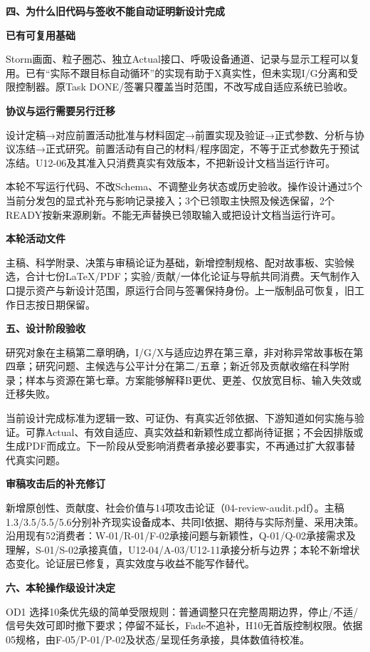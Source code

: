 \documentclass[11pt,a4paper]{article}
\newcommand{\reviewsection}[1]{\par\Needspace{9\baselineskip}\vspace{10pt}\begin{center}{\titlelatin\titlecjk\bfseries\fontsize{14}{20}\selectfont #1}\end{center}}
\newcommand{\reviewsubsection}[1]{\par\Needspace{4\baselineskip}\vspace{4pt}\begin{center}{\titlelatin\titlecjk\bfseries\fontsize{12}{18}\selectfont #1}\end{center}}
\begin{document}
\reviewsection{四、为什么旧代码与签收不能自动证明新设计完成}
\reviewsubsection{4.1 已有可复用基础}
Storm画面、粒子圈芯、独立Actual接口、呼吸设备通道、记录与显示工程可以复用。已有“实际不跟目标自动循环”的实现有助于X真实性，但未实现I/\allowbreak{}G分离和受限控制器。原Task DONE/\allowbreak{}签署只覆盖当时范围，不改写成自适应系统已验收。


\reviewsubsection{4.2 协议与运行需要另行迁移}
设计定稿→对应前置活动批准与材料固定→前置实现及验证→正式参数、分析与协议冻结→正式研究。前置活动有自己的材料/\allowbreak{}程序固定，不等于正式参数先于预试冻结。U12-\allowbreak{}06及其准入只消费真实有效版本，不把新设计文档当运行许可。


本轮不写运行代码、不改Schema、不调整业务状态或历史验收。操作设计通过5个当前分发包的显式补充与影响记录接入；3个已领取主快照及候选保留，2个READY按新来源刷新。不能无声替换已领取输入或把设计文档当运行许可。


\reviewsubsection{4.3 本轮活动文件}
主稿、科学附录、决策与审稿论证为基础，新增控制规格、配对故事板、实验候选，合计七份LaTeX/\allowbreak{}PDF；实验/贡献/一体化论证与导航共同消费。天气制作入口提示资产与新设计范围，原运行合同与签署保持身份。上一版制品可恢复，旧工作日志按日期保留。


\reviewsection{五、设计阶段验收}
研究对象在主稿第二章明确，I/\allowbreak{}G/\allowbreak{}X与适应边界在第三章，非对称异常故事板在第四章；研究问题、主候选与公平计分在第二/\allowbreak{}五章；新近邻及贡献收缩在科学附录；样本与资源在第七章。方案能够解释B更优、更差、仅放宽目标、输入失效或迁移失败。


当前设计完成标准为逻辑一致、可证伪、有真实近邻依据、下游知道如何实施与验证。可靠Actual、有效自适应、真实效益和新颖性成立都尚待证据；不会因排版或生成PDF而成立。下一阶段从受影响消费者承接必要事实，不再通过扩大叙事替代真实问题。


\reviewsubsection{5.1 审稿攻击后的补充修订}
新增原创性、贡献度、社会价值与14项攻击论证（04-\allowbreak{}review-\allowbreak{}audit.pdf）。主稿1.3/\allowbreak{}3.5/\allowbreak{}5.5/\allowbreak{}5.6分别补齐现实设备成本、共同I依据、期待与实际剂量、采用决策。沿用现有52消费者：W-\allowbreak{}01/\allowbreak{}R-\allowbreak{}01/\allowbreak{}F-\allowbreak{}02承接问题与新颖性，Q-\allowbreak{}01/\allowbreak{}Q-\allowbreak{}02承接需求及理解，S-\allowbreak{}01/\allowbreak{}S-\allowbreak{}02承接真值，U12-\allowbreak{}04/\allowbreak{}A-\allowbreak{}03/\allowbreak{}U12-\allowbreak{}11承接分析与边界；本轮不新增状态变化。论证层已修复，真实效度与收益不能写作替代。
\reviewsection{六、本轮操作级设计决定}
OD1 选择10条优先级的简单受限规则：普通调整只在完整周期边界，停止/不适/信号失效可即时撤下要求；停留不延长，Fade不追补，H10无首版控制权限。依据05规格，由F-05/P-01/P-02及状态/呈现任务承接，具体数值待校准。
\end{document}
